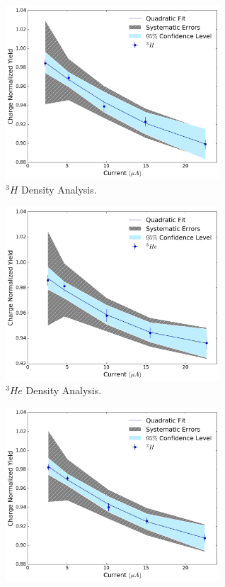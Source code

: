 \documentclass[final,5p,times,twocolumn]{elsarticle}
\begin{document}
\begin{figure}[h]
\begin{center}
  \begin{subfigure}{8cm}
    \centering\includegraphics[width=8cm]{images/tritium_data.pdf}
    \caption{$^{3}H$ Density Analysis. }
    \label{fig:tritium_data}
  \end{subfigure}
  \begin{subfigure}{8cm}
    \centering\includegraphics[width=8cm]{images/helium_data.pdf}
    \caption{$^{3}He$ Density Analysis.}
    \label{fig:helium_data}
  \end{subfigure}
  \begin{subfigure}{8cm}
    \centering\includegraphics[width=8cm]{images/deuterium_data.pdf}

\end{subfigure}
\end{center}
\end{figure}
\end{document}
